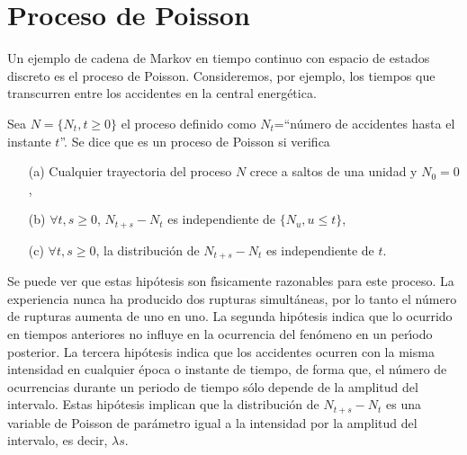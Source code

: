 \section{Proceso de Poisson}
Un ejemplo de cadena de Markov en tiempo continuo con espacio de
estados discreto es el proceso de Poisson. Consideremos, por
ejemplo, los tiempos que transcurren entre los accidentes en la
central energ\'{e}tica.
\par
Sea $N=\{N_t,t\geq 0\}$ el proceso
definido como $N_t$=``n\'{u}mero de accidentes hasta el instante
$t$''. Se dice que es un proceso de Poisson si verifica
\begin{enumerate}
  \item[(a)] Cualquier trayectoria del proceso $N$ crece a saltos de
  una unidad y $N_0=0$,
  \item[(b)] $\forall t,s\geq 0$, $N_{t+s}-N_t$ es independiente de $\{N_u, u\leq t\}$,
  \item[(c)] $\forall t,s\geq 0$, la distribuci\'{o}n de $N_{t+s}-N_t$ es independiente
  de $t$.
\end{enumerate}
Se puede ver que estas hip\'{o}tesis son f\'{\i}sicamente razonables para
este proceso. La experiencia nunca ha producido dos rupturas
simult\'{a}neas, por lo tanto el n\'{u}mero de rupturas aumenta de uno en
uno. La segunda hip\'{o}tesis indica que lo ocurrido en tiempos
anteriores no influye en la ocurrencia del fen\'{o}meno en un per\'{\i}odo
posterior. La tercera hip\'{o}tesis indica que los accidentes ocurren
con la misma intensidad en cualquier \'{e}poca o instante de tiempo,
de forma que, el n\'{u}mero de ocurrencias durante un periodo de
tiempo s\'{o}lo depende de la amplitud del intervalo. Estas hip\'{o}tesis
implican que la distribuci\'{o}n de $N_{t+s}-N_t$ es una variable de
Poisson de par\'{a}metro igual a la intensidad por la amplitud del
intervalo, es decir, $\lambda s$.
